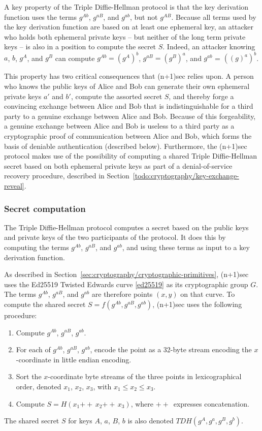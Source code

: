 \documentclass{article}
\def\concat{\mathbin{+\!\!\!+\,}}
\begin{document}
A key property of the Triple Diffie-Hellman protocol is that the key derivation function uses the terms $g^{Ab}$, $g^{aB}$, and $g^{ab}$, but not $g^{AB}$.
Because all terms used by the key derivation function are based on at least one ephemeral key, an attacker who holds both ephemeral private keys -- but neither of the long term private keys -- is also in a position to compute the secret $S$.
Indeed, an attacker knowing $a$, $b$, $g^A$, and $g^B$ can compute $g^{Ab} = (g^A)^b$, $g^{aB} = (g^B)^a$, and $g^{ab}$ = $((g)^a)^b$.

This property has two critical consequences that (n+1)sec relies upon.
A person who knows the public keys of Alice and Bob can generate their own ephemeral private keys $a'$ and $b'$, compute the assorted secret $S$, and thereby forge a convincing exchange between Alice and Bob that is indistinguishable for a third party to a genuine exchange between Alice and Bob.
Because of this forgeability, a genuine exchange between Alice and Bob is useless to a third party as a cryptographic proof of communication between Alice and Bob, which forms the basis of deniable authentication (described below).
Furthermore, the (n+1)sec protocol makes use of the possibility of computing a shared Triple Diffie-Hellman secret based on both ephemeral private keys as part of a denial-of-service recovery procedure, described in Section~\ref{todo:cryptography/key-exchange-reveal}.

\subsubsection{Secret computation}
\label{sec:cryptography/triple-diffie-hellman/secret-computation}

The Triple Diffie-Hellman protocol computes a secret based on the public keys and private keys of the two participants of the protocol.
It does this by computing the terms $g^{Ab}$, $g^{aB}$, and $g^{ab}$, and using these terms as input to a key derivation function.

As described in Section~\ref{sec:cryptography/cryptographic-primitives}, (n+1)sec uses the Ed25519 Twisted Edwards curve \ref{ed25519} as its cryptographic group $G$.
The terms $g^{Ab}$, $g^{aB}$, and $g^{ab}$ are therefore points $(x, y)$ on that curve.
To compute the shared secret $S = f(g^{Ab}, g^{aB}, g^{ab})$, (n+1)sec uses the following procedure:
\begin{enumerate}
\item Compute $g^{Ab}$, $g^{aB}$, $g^{ab}$.
\item For each of $g^{Ab}$, $g^{aB}$, $g^{ab}$, encode the point as a 32-byte stream encoding the $x$-coordinate in little endian encoding.
\item Sort the $x$-coordinate byte streams of the three points in lexicographical order, denoted $x_1$, $x_2$, $x_3$, with $x_1 \leq x_2 \leq x_3$.
\item Compute $S = H(x_1 \concat x_2 \concat x_3)$, where $\concat$ expresses concatenation.
\end{enumerate}
The shared secret $S$ for keys $A$, $a$, $B$, $b$ is also denoted $TDH(g^A, g^a, g^B, g^b)$.
\end{document}
